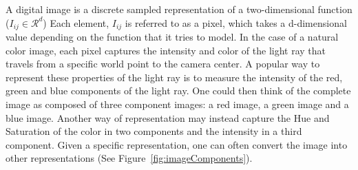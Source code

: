 
A digital image is a discrete sampled representation of a two-dimensional function ($I_{ij} \in \mathcal{R}^d$)
Each element, $I_{ij}$ is referred to as a pixel, which takes a d-dimensional value depending on the function
that it tries to model. In the case of a natural color image, each pixel captures the intensity and color
of the light ray that travels from a specific world point to the camera center. A popular way to represent
these properties of the light ray is to measure the intensity of the red, green and blue components of
the light ray. One could then think of the complete image as composed of three component images: a red image,
a green image and a blue image. Another way of representation may instead capture the Hue and Saturation of
the color in two components and the intensity in a third component. Given a specific representation, one can
often convert the image into other representations (See Figure~\ref{fig:imageComponents}).


